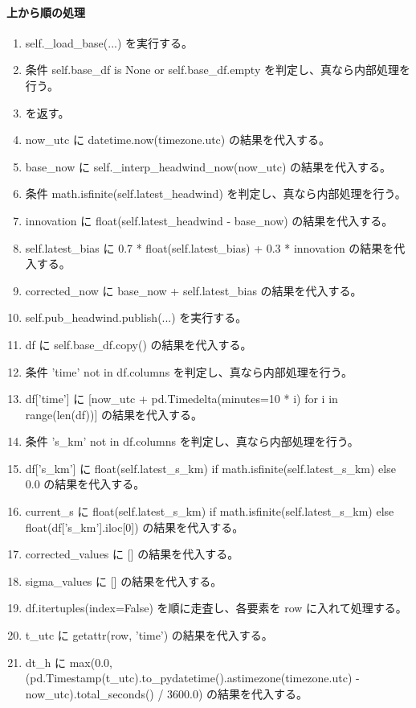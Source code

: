 \documentclass[a4paper,11pt]{article}
\begin{document}
            \paragraph{上から順の処理}
            \begin{enumerate}[leftmargin=1.8em]
            \item self.\_load\_base(...) を実行する。
\item 条件 self.base\_df is None or self.base\_df.empty を判定し、真なら内部処理を行う。
\item    を返す。
\item now\_utc に datetime.now(timezone.utc) の結果を代入する。
\item base\_now に self.\_interp\_headwind\_now(now\_utc) の結果を代入する。
\item 条件 math.isfinite(self.latest\_headwind) を判定し、真なら内部処理を行う。
\item   innovation に float(self.latest\_headwind - base\_now) の結果を代入する。
\item   self.latest\_bias に 0.7 * float(self.latest\_bias) + 0.3 * innovation の結果を代入する。
\item corrected\_now に base\_now + self.latest\_bias の結果を代入する。
\item self.pub\_headwind.publish(...) を実行する。
\item df に self.base\_df.copy() の結果を代入する。
\item 条件 'time' not in df.columns を判定し、真なら内部処理を行う。
\item   df['time'] に [now\_utc + pd.Timedelta(minutes=10 * i) for i in range(len(df))] の結果を代入する。
\item 条件 's\_km' not in df.columns を判定し、真なら内部処理を行う。
\item   df['s\_km'] に float(self.latest\_s\_km) if math.isfinite(self.latest\_s\_km) else 0.0 の結果を代入する。
\item current\_s に float(self.latest\_s\_km) if math.isfinite(self.latest\_s\_km) else float(df['s\_km'].iloc[0]) の結果を代入する。
\item corrected\_values に [] の結果を代入する。
\item sigma\_values に [] の結果を代入する。
\item df.itertuples(index=False) を順に走査し、各要素を row に入れて処理する。
\item   t\_utc に getattr(row, 'time') の結果を代入する。
\item   dt\_h に max(0.0, (pd.Timestamp(t\_utc).to\_pydatetime().astimezone(timezone.utc) - now\_utc).total\_seconds() / 3600.0) の結果を代入する。

\end{enumerate}
\end{document}
